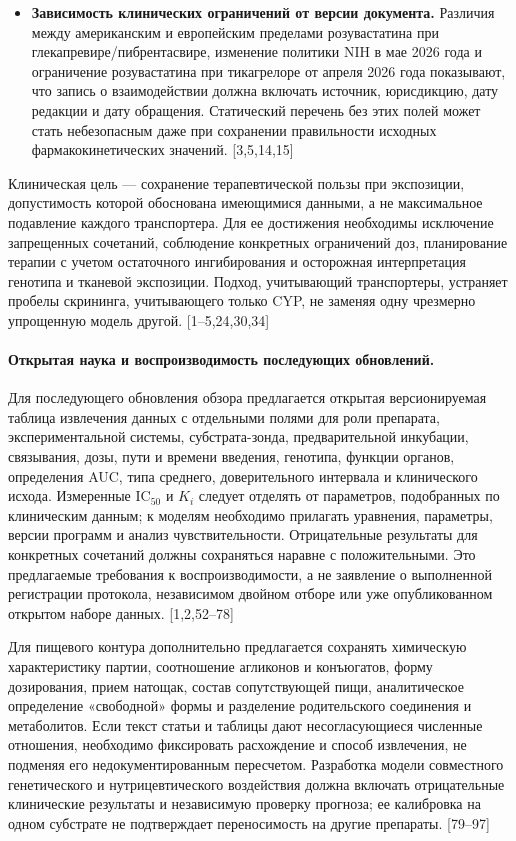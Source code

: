 \documentclass[11pt]{article}
\begin{document}
\begin{itemize}
\item \textbf{Зависимость клинических ограничений от версии документа.} Различия между американским и европейским пределами розувастатина при глекапревире/пибрентасвире, изменение политики NIH в мае 2026 года и ограничение розувастатина при тикагрелоре от апреля 2026 года показывают, что запись о взаимодействии должна включать источник, юрисдикцию, дату редакции и дату обращения. Статический перечень без этих полей может стать небезопасным даже при сохранении правильности исходных фармакокинетических значений. [3,5,14,15]
\end{itemize}

Клиническая цель --- сохранение терапевтической пользы при экспозиции, допустимость которой обоснована имеющимися данными, а не максимальное подавление каждого транспортера. Для ее достижения необходимы исключение запрещенных сочетаний, соблюдение конкретных ограничений доз, планирование терапии с учетом остаточного ингибирования и осторожная интерпретация генотипа и тканевой экспозиции. Подход, учитывающий транспортеры, устраняет пробелы скрининга, учитывающего только CYP, не заменяя одну чрезмерно упрощенную модель другой. [1--5,24,30,34]

\paragraph{Открытая наука и воспроизводимость последующих обновлений.}
Для последующего обновления обзора предлагается открытая версионируемая таблица извлечения данных с отдельными полями для роли препарата, экспериментальной системы, субстрата-зонда, предварительной инкубации, связывания, дозы, пути и времени введения, генотипа, функции органов, определения AUC, типа среднего, доверительного интервала и клинического исхода. Измеренные \(\mathrm{IC}_{50}\) и \(K_i\) следует отделять от параметров, подобранных по клиническим данным; к моделям необходимо прилагать уравнения, параметры, версии программ и анализ чувствительности. Отрицательные результаты для конкретных сочетаний должны сохраняться наравне с положительными. Это предлагаемые требования к воспроизводимости, а не заявление о выполненной регистрации протокола, независимом двойном отборе или уже опубликованном открытом наборе данных. [1,2,52--78]

Для пищевого контура дополнительно предлагается сохранять химическую характеристику партии, соотношение агликонов и конъюгатов, форму дозирования, прием натощак, состав сопутствующей пищи, аналитическое определение «свободной» формы и разделение родительского соединения и метаболитов. Если текст статьи и таблицы дают несогласующиеся численные отношения, необходимо фиксировать расхождение и способ извлечения, не подменяя его недокументированным пересчетом. Разработка модели совместного генетического и нутрицевтического воздействия должна включать отрицательные клинические результаты и независимую проверку прогноза; ее калибровка на одном субстрате не подтверждает переносимость на другие препараты. [79--97]
\end{document}
